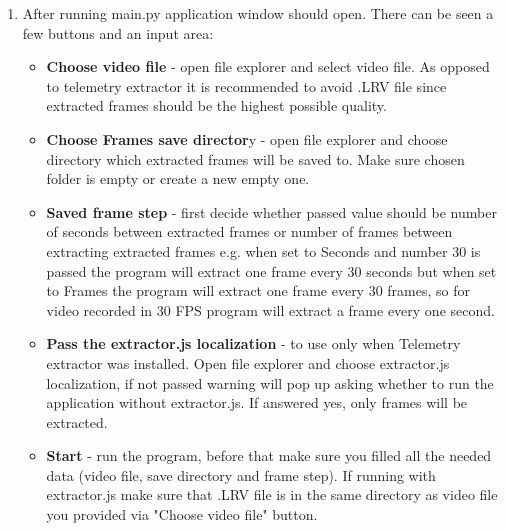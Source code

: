 \documentclass[a4paper,12pt]{book}
\begin{document}
\begin{enumerate}
	\item \begin{minipage}[t]{\linewidth}
		\raggedright
		\medskip	
	\end{minipage}
	After running main.py application window should open.
	There can be seen a few buttons and an input area:
	\begin{itemize}
		\item \textbf{Choose video file} - open file explorer and select video file. As opposed to telemetry extractor it is recommended to avoid .LRV file since extracted frames should be the highest possible quality.
		\item \textbf{Choose Frames save director}y - open file explorer and choose directory which extracted frames will be saved to. Make sure chosen folder is empty or create a new empty one.
		\item \textbf{Saved frame step} - first decide whether passed value should be number of seconds between extracted frames or number of frames between extracting extracted frames  e.g. when set to Seconds and number 30 is passed the program will extract one frame every 30 seconds but when set to Frames the program will extract one frame every 30 frames, so for video recorded in 30 FPS program will extract a frame every one second.
		\item \textbf{Pass the extractor.js localization} - to use only when Telemetry extractor was installed. Open file explorer and choose extractor.js localization, if not passed warning will pop up asking whether to run the application without extractor.js. If answered yes, only frames will be extracted.
		\item \textbf{Start} - run the program, before that make sure you filled all the needed data (video file, save directory and frame step). If running with extractor.js make sure that .LRV file is in the same directory as video file you provided via "Choose video file" button.

\end{itemize}
\end{enumerate}
\end{document}
